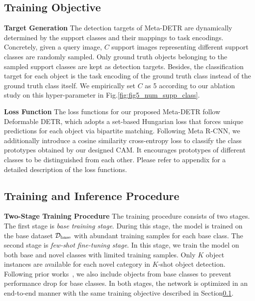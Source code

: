 \documentclass[letterpaper]{article} \usepackage{aaai22}  \usepackage{times}  \usepackage{helvet}  \usepackage{courier}  \usepackage[hyphens]{url}  \usepackage{graphicx} \urlstyle{rm} \def\UrlFont{\rm}  \usepackage{natbib}  \usepackage{caption} \DeclareCaptionStyle{ruled}{labelfont=normalfont,labelsep=colon,strut=off} \frenchspacing  \setlength{\pdfpagewidth}{8.5in}  \setlength{\pdfpageheight}{11in}  \usepackage{algorithm}
\begin{document}
\subsection{Training Objective} \label{sec:TrainingObjective}

\noindent\textbf{Target Generation\;\;}
The detection targets of Meta-DETR are dynamically determined by the support classes and their mappings to task encodings. Concretely, given a query image, $C$ support images representing different support classes are randomly sampled. Only ground truth objects belonging to the sampled support classes are kept as detection targets. Besides, the classification target for each object is the task encoding of the ground truth class instead of the ground truth class itself. We empirically set $C$ as 5 according to our ablation study on this hyper-parameter in Fig.\;\ref{fig:fig5_num_supp_class}.

\smallskip
\noindent\textbf{Loss Function\;\;}
The loss functions for our proposed Meta-DETR follow Deformable DETR\;\cite{DeformableDETR}, which adopts a set-based Hungarian loss that forces unique predictions for each object via bipartite matching. Following Meta R-CNN\;\cite{metarcnn}, we additionally introduce a cosine similarity cross-entropy loss\;\cite{CloserFewshotClassification} to classify the class prototypes obtained by our designed CAM. It encourages prototypes of different classes to be distinguished from each other. Please refer to appendix for a detailed description of the loss functions.


\subsection{Training and Inference Procedure}
\noindent\textbf{Two-Stage Training Procedure\;\;}
The training procedure consists of two stages.
The first stage is \textit{base training stage}. During this stage, the model is trained on the base dataset $\mathcal{D}_{\rm base}$ with abundant training samples for each base class.
The second stage is \textit{few-shot fine-tuning stage}. In this stage, we train the model on both base and novel classes with limited training samples. Only $K$ object instances are available for each novel category in $K$-shot object detection. Following prior works~\cite{metarcnn,fsdet,FSDetView}, we also include objects from base classes to prevent performance drop for base classes. In both stages, the network is optimized in an end-to-end manner with the same training objective described in Section\;\ref{sec:TrainingObjective}.
\end{document}
